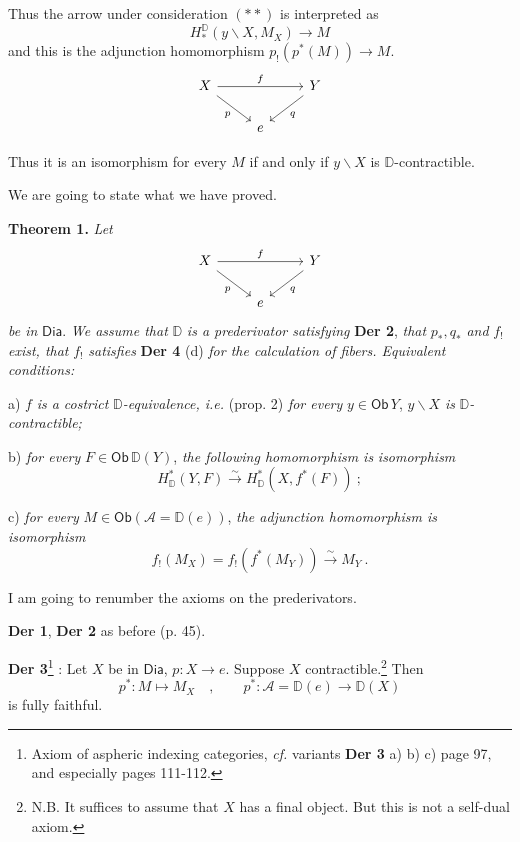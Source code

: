 \documentclass[11pt]{article}
\newcommand{\printedpage}[1]{\marginpar{\footnotesize p.~#1}}
\newcommand{\msp}[1]{\marginpar{\footnotesize [#1]}}
\newcommand{\D}{\mathbb{D}}
\newcommand{\Dia}{\mathsf{Dia}}
\newcommand{\Ob}{\mathsf{Ob}}
\newcommand{\isoto}{\overset{\sim}{\longrightarrow}}
\begin{document}
\printedpage{39}
\msp{page 67}

\noindent Thus the arrow under consideration $(**)$ is interpreted as
\[
H_*^{\D}(y\backslash X, M_X) \longrightarrow M
\]
and this is the adjunction homomorphism $p_!(p^*(M)) \to M$.
\[
\begin{tikzcd}
X \arrow[rr, "f"] \arrow[dr, "p"{swap}] & & Y \arrow[dl, "q"] \\
& e &
\end{tikzcd}
\]

\noindent Thus it is an isomorphism for every $M$ if and only if $y\backslash X$ is $\D$-contractible.

\noindent We are going to state what we have proved.

\noindent\textbf{Theorem 1.} \textit{Let}
\[
\begin{tikzcd}
X \arrow[rr, "f"] \arrow[dr, "p"{swap}] & & Y \arrow[dl, "q"] \\
& e &
\end{tikzcd}
\]
\textit{be in} $\Dia$. \textit{We assume that} $\D$ \textit{is a prederivator satisfying} \textbf{Der 2}, \textit{that} $p_*, q_*$ \textit{and} $f_!$ \textit{exist, that} $f_!$ \textit{satisfies} \textbf{Der 4} (d) \textit{for the calculation of fibers. Equivalent conditions:}

a) $f$ \textit{is a costrict} $\D$\textit{-equivalence, i.e.} (prop. 2) \textit{for every} $y \in \Ob\, Y$, $y\backslash X$ \textit{is} $\D$\textit{-contractible;}

b) \textit{for every} $F \in \Ob\, \D(Y)$, \textit{the following homomorphism is} \textit{isomorphism}
\[
H^*_{\D}(Y, F) \isoto H^*_{\D}(X, f^*(F)) \ ;
\]

c) \textit{for every} $M \in \Ob(\mathcal{A} = \D(e))$, \textit{the adjunction homomorphism is} \textit{isomorphism}
\[
f_!(M_X) = f_!(f^*(M_Y)) \isoto M_Y \ .
\]

I am going to renumber the axioms on the prederivators. %

\noindent\textbf{Der 1}, \textbf{Der 2} as before (p. 45).

\noindent\textbf{Der 3}\footnote[28]{Axiom of aspheric indexing categories, \textit{cf.} variants \textbf{Der 3} a) b) c) page 97, and especially pages 111-112.} : Let $X$ be in $\Dia$, $p : X \to e$. Suppose $X$ contractible.\footnote[29]{N.B. It suffices to assume that $X$ has a final object. But this is not a self-dual axiom.} Then
\[
p^* : M \longmapsto M_X \quad , \qquad p^* : \mathcal{A} = \D(e) \longrightarrow \D(X)
\]
is fully faithful.
\end{document}
